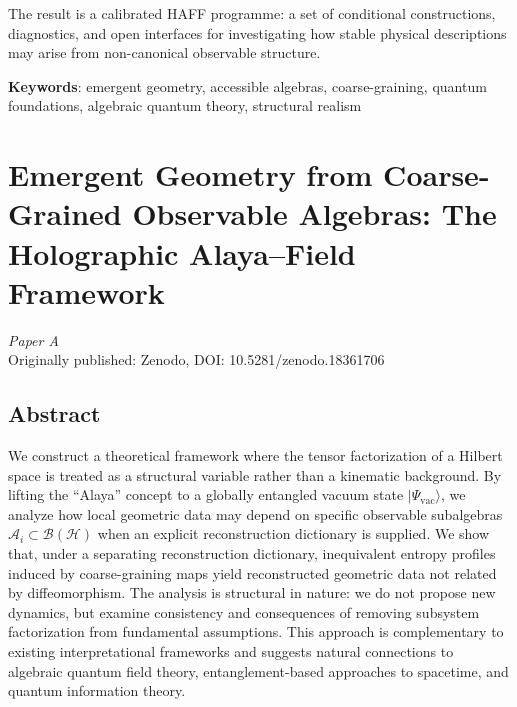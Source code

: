 \documentclass[12pt,a4paper,openany]{book}
\begin{document}
The result is a calibrated HAFF programme: a set of conditional constructions, diagnostics, and open interfaces for investigating how stable physical descriptions may arise from non-canonical observable structure.

\bigskip
\noindent\textbf{Keywords}: emergent geometry, accessible algebras, coarse-graining, quantum foundations, algebraic quantum theory, structural realism

\tableofcontents

\mainmatter

\chapter{Emergent Geometry from Coarse-Grained Observable Algebras: The Holographic Alaya--Field Framework}
\label{chap:paperA}

\begin{center}
\textit{Paper A}\\[0.5em]
Originally published: Zenodo, DOI: 10.5281/zenodo.18361706
\end{center}

\bigskip

\section*{Abstract}
We construct a theoretical framework where the tensor factorization of a Hilbert space is treated as a structural variable rather than a kinematic background. 
By lifting the ``Alaya'' concept to a globally entangled vacuum state $|\Psi_{\text{vac}}\rangle$, we analyze how local geometric data may depend on specific observable subalgebras $\mathcal{A}_i \subset \mathcal{B}(\mathcal{H})$ when an explicit reconstruction dictionary is supplied. 
We show that, under a separating reconstruction dictionary, inequivalent entropy profiles induced by coarse-graining maps yield reconstructed geometric data not related by diffeomorphism.
The analysis is structural in nature: we do not propose new dynamics, but examine consistency and consequences of removing subsystem factorization from fundamental assumptions. 
This approach is complementary to existing interpretational frameworks and suggests natural connections to algebraic quantum field theory, entanglement-based approaches to spacetime, and quantum information theory.
\end{document}
